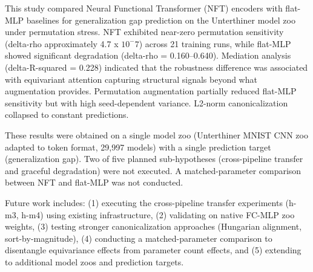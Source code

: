 
This study compared Neural Functional Transformer (NFT) encoders with flat-MLP baselines for generalization gap prediction on the Unterthiner model zoo under permutation stress. NFT exhibited near-zero permutation sensitivity (delta-rho approximately 4.7 x $10^-7$) across 21 training runs, while flat-MLP showed significant degradation (delta-rho = 0.160--0.640). Mediation analysis (delta-R-squared = 0.228) indicated that the robustness difference was associated with equivariant attention capturing structural signals beyond what augmentation provides. Permutation augmentation partially reduced flat-MLP sensitivity but with high seed-dependent variance. L2-norm canonicalization collapsed to constant predictions.

These results were obtained on a single model zoo (Unterthiner MNIST CNN zoo adapted to token format, 29,997 models) with a single prediction target (generalization gap). Two of five planned sub-hypotheses (cross-pipeline transfer and graceful degradation) were not executed. A matched-parameter comparison between NFT and flat-MLP was not conducted.

Future work includes: (1) executing the cross-pipeline transfer experiments (h-m3, h-m4) using existing infrastructure, (2) validating on native FC-MLP zoo weights, (3) testing stronger canonicalization approaches (Hungarian alignment, sort-by-magnitude), (4) conducting a matched-parameter comparison to disentangle equivariance effects from parameter count effects, and (5) extending to additional model zoos and prediction targets.
